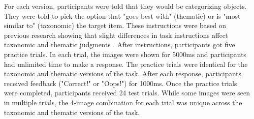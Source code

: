 \documentclass[../dissertation.tex]{subfiles}
\begin{document}
For each version, participants were told that they would be categorizing objects. They were told to pick the option that "goes best with" (thematic) or is "most similar to" (taxonomic) the target item. These instructions were based on previous research showing that slight differences in task instructions affect taxonomic and thematic judgments \citep{Lin2001}. After instructions, participants got five practice trials. In each trial, the images were shown for 5000ms and participants had unlimited time to make a response. The practice trials were identical for the taxonomic and thematic versions of the task. After each response, participants received feedback ("Correct!" or "Oops!") for 1000ms. Once the practice trials were completed, participants received 24 test trials. While some images were seen in multiple trials, the 4-image combination for each trial was unique across the taxonomic and thematic versions of the task.
\end{document}

